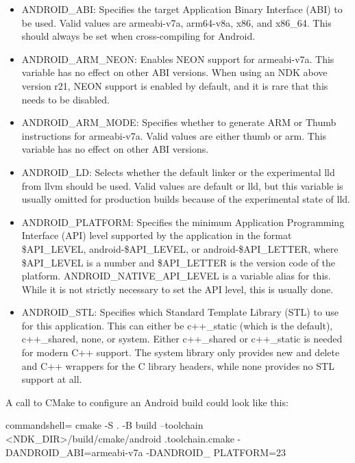 \begin{itemize}
\item 
ANDROID\_ABI: Specifies the target Application Binary Interface (ABI) to be used. Valid values are armeabi-v7a, arm64-v8a, x86, and x86\_64. This should always be set when cross-compiling for Android.

\item 
ANDROID\_ARM\_NEON: Enables NEON support for armeabi-v7a. This variable has no effect on other ABI versions. When using an NDK above version r21, NEON support is enabled by default, and it is rare that this needs to be disabled.

\item 
ANDROID\_ARM\_MODE: Specifies whether to generate ARM or Thumb instructions for armeabi-v7a. Valid values are either thumb or arm. This variable has no effect on other ABI versions.

\item 
ANDROID\_LD: Selects whether the default linker or the experimental lld from llvm should be used. Valid values are default or lld, but this variable is usually omitted for production builds because of the experimental state of lld.

\item 
ANDROID\_PLATFORM: Specifies the minimum Application Programming Interface (API) level supported by the application in the format \$API\_LEVEL, android-\$API\_LEVEL, or android-\$API\_LETTER, where \$API\_LEVEL is a number and \$API\_LETTER is the version code of the platform. ANDROID\_NATIVE\_API\_LEVEL is a variable alias for this. While it is not strictly necessary to set the API level, this is usually done.

\item 
ANDROID\_STL: Specifies which Standard Template Library (STL) to use for this application. This can either be c++\_static (which is the default), c++\_shared,
none, or system. Either c++\_shared or c++\_static is needed for modern C++ support. The system library only provides new and delete and C++ wrappers for the C library headers, while none provides no STL support at all.
\end{itemize}

A call to CMake to configure an Android build could look like this:

\begin{tcblisting}{commandshell={}}
cmake -S . -B build --toolchain <NDK_DIR>/build/cmake/android
  .toolchain.cmake -DANDROID_ABI=armeabi-v7a -DANDROID_
    PLATFORM=23
\end{tcblisting}

